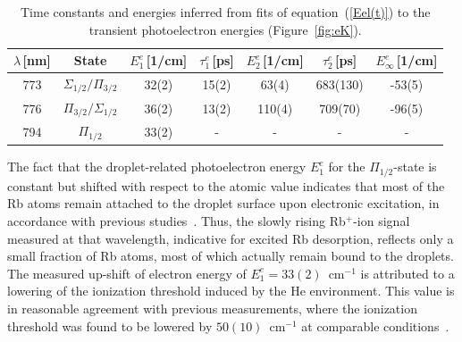 \begin{table}[t]
	\begin{center}
		\begin{tabular}{|c c | c c | c c | c|}
			\hline
			$\lambda$\,[nm] & State & $E^e_1$\,[1/cm] & $\tau^e_1$\,[ps] & $E^e_2$\,[1/cm] & $\tau^e_2$\,[ps] & $E^e_\infty$\,[1/cm]\\  
			\hline\hline
			773 & $\Sigma_{1/2}/\Pi_{3/2}$ & 32(2) & 15(2) & 63(4) & 683(130) & -53(5) \\
			776 & $\Pi_{3/2}/\Sigma_{1/2}$ & 36(2) & 13(2) & 110(4) & 709(70) & -96(5) \\
			794 & $\Pi_{1/2}$ & 33(2) & - & - & - & - \\
			\hline
		\end{tabular}
		\caption{Time constants and energies inferred from fits of equation~(\ref{Eel(t)}) to the transient photoelectron energies (Figure~\ref{fig:eK}).}
		\label{tab:FitParsEl}
	\end{center}
\end{table}
The fact that the droplet-related photoelectron energy $E^e_1$ for the $\Pi_{1/2}$-state is constant but shifted with respect to the atomic value indicates that most of the Rb atoms remain attached to the droplet surface upon electronic excitation, in accordance with previous studies~\cite{Auboeck:2008,TheisenJPCL:2011}. Thus, the slowly rising Rb$^+$-ion signal measured at that wavelength, indicative for excited Rb desorption, reflects only a small fraction of Rb atoms, most of which actually remain bound to the droplets. The measured up-shift of electron energy of $E^e_1=33(2)$~cm$^{-1}$ is attributed to a lowering of the ionization threshold induced by the He environment. This value is in reasonable agreement with previous measurements, where the ionization threshold was found to be lowered by $50(10)$~cm$^{-1}$ at comparable conditions~\cite{TheisenJPCL:2011}. 

